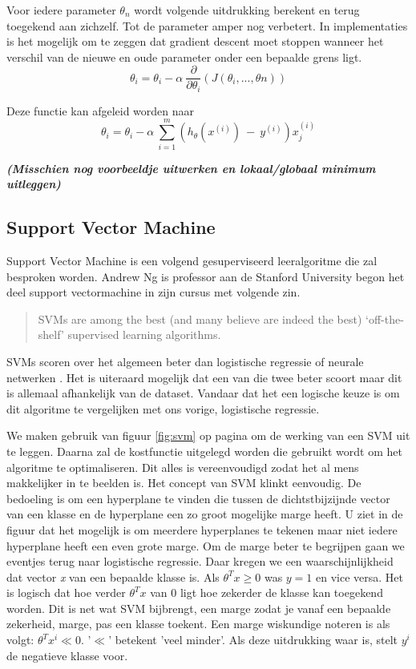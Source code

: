 Voor iedere parameter $\theta_{n}$ wordt volgende uitdrukking berekent en terug toegekend aan zichzelf. Tot de parameter amper nog verbetert. In implementaties is het mogelijk om te zeggen dat gradient descent moet stoppen wanneer het verschil van de nieuwe en oude parameter onder een bepaalde grens ligt. 
$$
\theta_{i} = \theta_{i} - \alpha\:\frac{\partial}{\partial\theta_{i}}(J(\theta_{i}, ... , \theta{n}))
$$

Deze functie kan afgeleid worden naar 
$$
\theta_{i} = \theta_{i} - \alpha\:\sum_{i=1}^{m}(h_{\theta}(x^{(i)})\:-\:y^{(i)} ) x_{j}^{(i) }
$$

\textbf{\textit{(Misschien nog voorbeeldje uitwerken en lokaal/globaal minimum uitleggen)}}


\subsection{Support Vector Machine}
\label{sec:Support-Vector-Machine}
Support Vector Machine is een volgend gesuperviseerd leeralgoritme die zal besproken worden. 
Andrew Ng is professor aan de Stanford University begon het deel support vectormachine in zijn cursus \autocite{cursusAndrewNg} met volgende zin.
\begin{quote}
	SVMs are among the best (and many believe are indeed the best) ‘off-the-shelf’ supervised learning algorithms.
\end{quote}

SVMs scoren over het algemeen beter dan logistische regressie of neurale netwerken \autocite{vergelijkingSupervised}. Het is uiteraard mogelijk dat een van die twee beter scoort maar dit is allemaal afhankelijk van de dataset. Vandaar dat het een logische keuze is om dit algoritme te vergelijken met ons vorige, logistische regressie. 

We maken gebruik van figuur \ref{fig:svm} op pagina \pageref{fig:svm} om de werking van een SVM uit te leggen. Daarna zal de kostfunctie uitgelegd worden die gebruikt wordt om het algoritme te optimaliseren. Dit alles is vereenvoudigd zodat het al mens makkelijker in te beelden is.
Het concept van SVM klinkt eenvoudig. De bedoeling is om een hyperplane te vinden die tussen de dichtstbijzijnde vector van een klasse en de hyperplane een zo groot mogelijke marge heeft. U ziet in de figuur dat het mogelijk is om meerdere hyperplanes te tekenen maar niet iedere hyperplane heeft een even grote marge. Om de marge beter te begrijpen gaan we eventjes terug naar logistische regressie. Daar kregen we een waarschijnlijkheid dat vector \textit{x} van een bepaalde klasse is. Als $\theta^{T}x \geq 0$ was $y=1$ en vice versa. Het is logisch dat hoe verder $\theta^{T}x$ van 0 ligt hoe zekerder de klasse kan toegekend worden. Dit is net wat SVM bijbrengt, een marge zodat je vanaf een bepaalde zekerheid, marge, pas een klasse toekent. Een marge wiskundige noteren is als volgt: $\theta^{T}x^{i} \ll 0$. '$\ll$' betekent 'veel minder'. Als deze uitdrukking waar is, stelt $y^{i}$ de negatieve klasse voor.
 
